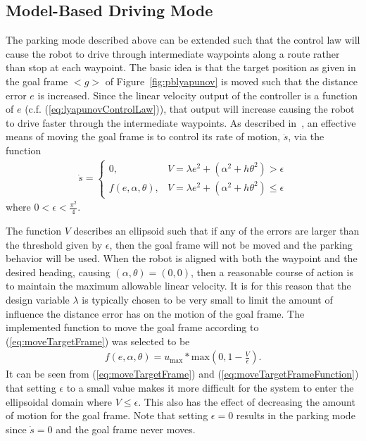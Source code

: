 \subsection{Model-Based Driving Mode}%
\label{sec:drivingMode}
The parking mode described above can be extended such that the control law will cause the robot to drive through intermediate waypoints along a route rather than stop at each waypoint.
The basic idea is that the target position as given in the goal frame $<g>$ of Figure~\ref{fig:pblyapunov} is moved such that the distance error $e$ is increased.
Since the linear velocity output of the controller is a function of $e$ (c.f. (\ref{eq:lyapunovControlLaw})), that output will increase causing the robot to drive faster through the intermediate waypoints.
As described in~\cite{Aicardi_UnicycleLyapunov95}, an effective means of moving the goal frame is to control its rate of motion, $\dot{s}$, via the function
\begin{align}
\label{eq:moveTargetFrame}
\dot{s} =
\begin{cases}
0, & V = \lambda e^2 + (\alpha^2+h\theta^2) > \epsilon \\
f(e,\alpha,\theta), & V = \lambda e^2 + (\alpha^2+h\theta^2) \leq \epsilon
\end{cases}
\end{align}
where $0<\epsilon<\frac{\pi^2}{4}$.

The function $V$ describes an ellipsoid such that if any of the errors are larger than the threshold given by $\epsilon$, then the goal frame will not be moved and the parking behavior will be used.
When the robot is aligned with both the waypoint and the desired heading, causing $(\alpha,\theta)=(0,0)$, then a reasonable course of action is to maintain the maximum allowable linear velocity.
It is for this reason that the design variable $\lambda$ is typically chosen to be very small to limit the amount of influence the distance error has on the motion of the goal frame.
The implemented function to move the goal frame according to (\ref{eq:moveTargetFrame}) was selected to be
\begin{align}
\label{eq:moveTargetFrameFunction}
f(e,\alpha,\theta) = u_{\text{max}} * \text{max}\left(0, 1 - \frac{V}{\epsilon}\right).
\end{align}
It can be seen from (\ref{eq:moveTargetFrame}) and (\ref{eq:moveTargetFrameFunction}) that setting $\epsilon$ to a small value makes it more difficult for the system to enter the ellipsoidal domain where $V\leq\epsilon$.
This also has the effect of decreasing the amount of motion for the goal frame.
Note that setting $\epsilon=0$ results in the parking mode since $\dot{s}=0$ and the goal frame never moves.

